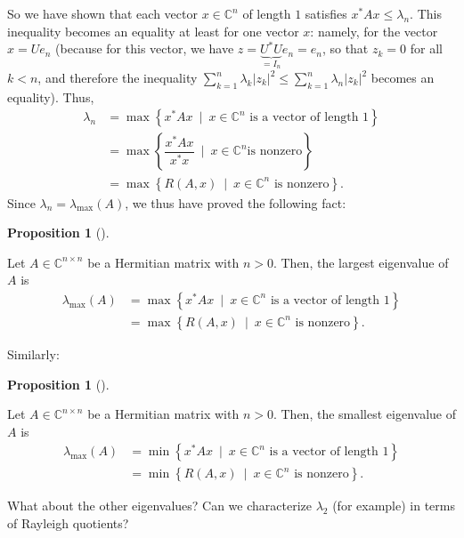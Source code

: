 \documentclass[numbers=enddot,12pt,final,onecolumn,notitlepage]{scrartcl}%
\numberwithin{exer}{subsection}
\theoremstyle{definition}
\newtheorem{prop}[theo]{Proposition}
\newenvironment{proposition}[1][]
{\begin{prop}[#1]\begin{leftbar}}
{\end{leftbar}\end{prop}}
\let\sumnonlimits\sum
\renewcommand{\sum}{\sumnonlimits\limits}
\begin{document}
So we have shown that each vector $x\in\mathbb{C}^{n}$ of length $1$ satisfies
$x^{\ast}Ax\leq\lambda_{n}$. This inequality becomes an equality at least for
one vector $x$: namely, for the vector $x=Ue_{n}$ (because for this vector, we
have $z=\underbrace{U^{\ast}U}_{=I_{n}}e_{n}=e_{n}$, so that $z_{k}=0$ for all
$k<n$, and therefore the inequality $\sum_{k=1}^{n}\lambda_{k}\left\vert
z_{k}\right\vert ^{2}\leq\sum_{k=1}^{n}\lambda_{n}\left\vert z_{k}\right\vert
^{2}$ becomes an equality). Thus,%
\begin{align*}
\lambda_{n}  &  =\max\left\{  x^{\ast}Ax\ \mid\ x\in\mathbb{C}^{n}\text{ is a
vector of length }1\right\} \\
&  =\max\left\{  \dfrac{x^{\ast}Ax}{x^{\ast}x}\ \mid\ x\in\mathbb{C}^{n}\text{
is nonzero}\right\} \\
&  =\max\left\{  R\left(  A,x\right)  \ \mid\ x\in\mathbb{C}^{n}\text{ is
nonzero}\right\}  .
\end{align*}
Since $\lambda_{n}=\lambda_{\max}\left(  A\right)  $, we thus have proved the
following fact:

\begin{proposition}
Let $A\in\mathbb{C}^{n\times n}$ be a Hermitian matrix with $n>0$. Then, the
largest eigenvalue of $A$ is%
\begin{align*}
\lambda_{\max}\left(  A\right)   &  =\max\left\{  x^{\ast}Ax\ \mid
\ x\in\mathbb{C}^{n}\text{ is a vector of length }1\right\} \\
&  =\max\left\{  R\left(  A,x\right)  \ \mid\ x\in\mathbb{C}^{n}\text{ is
nonzero}\right\}  .
\end{align*}

\end{proposition}

Similarly:

\begin{proposition}
Let $A\in\mathbb{C}^{n\times n}$ be a Hermitian matrix with $n>0$. Then, the
smallest eigenvalue of $A$ is%
\begin{align*}
\lambda_{\max}\left(  A\right)   &  =\min\left\{  x^{\ast}Ax\ \mid
\ x\in\mathbb{C}^{n}\text{ is a vector of length }1\right\} \\
&  =\min\left\{  R\left(  A,x\right)  \ \mid\ x\in\mathbb{C}^{n}\text{ is
nonzero}\right\}  .
\end{align*}

\end{proposition}

What about the other eigenvalues? Can we characterize $\lambda_{2}$ (for
example) in terms of Rayleigh quotients?
\end{document}
